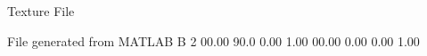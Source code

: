 Texture File

File generated from MATLAB
B 2
   00.00   90.0   0.00   1.00
   00.00   0.00   0.00   1.00

